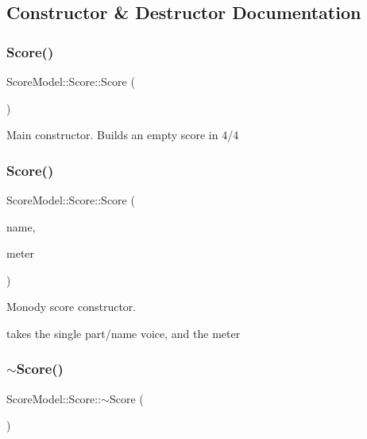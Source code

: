 \subsection{Constructor \& Destructor Documentation}
\mbox{\label{classScoreModel_1_1Score_acb19d6040f57ce1bf4e68dd8dab852cc}} 
\subsubsection{\texorpdfstring{Score()}{Score()}\hspace{0.1cm}{\footnotesize\ttfamily [1/2]}}
{\footnotesize\ttfamily Score\+Model\+::\+Score\+::\+Score (\begin{DoxyParamCaption}{ }\end{DoxyParamCaption})}

Main constructor. Builds an empty score in 4/4 \mbox{\label{classScoreModel_1_1Score_a8721726afd70c41fdf9307a97ded2039}} 
\subsubsection{\texorpdfstring{Score()}{Score()}\hspace{0.1cm}{\footnotesize\ttfamily [2/2]}}
{\footnotesize\ttfamily Score\+Model\+::\+Score\+::\+Score (\begin{DoxyParamCaption}\item[{std\+::string}]{name,  }\item[{\mbox{\hyperlink{classScoreModel_1_1ScoreMeter}{Score\+Meter}}}]{meter }\end{DoxyParamCaption})}

Monody score constructor.

takes the single part/name voice, and the meter \mbox{\label{classScoreModel_1_1Score_a0016a76d4d96c208c6dd586ab64491db}} 
\subsubsection{\texorpdfstring{$\sim$Score()}{~Score()}}
{\footnotesize\ttfamily Score\+Model\+::\+Score\+::$\sim$\+Score (\begin{DoxyParamCaption}{ }\end{DoxyParamCaption})}

